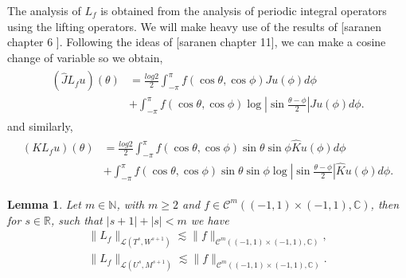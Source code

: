 \documentclass{article}
\newtheorem{lemma}[theorem]{Lemma}
\newcommand{\todo}[1]{{\color{red}[#1]}}
\newcommand{\IC}{{\mathbb C}}
\newcommand{\IN}{{\mathbb N}}
\newcommand{\IR}{{\mathbb R}}
\newcommand{\cmspace}[3]{\mathcal{C}^{#1} \left( #2, #3 \right)}
\newcommand{\iinterv}{(-1,1)\times(-1,1)}
\begin{document}
The analysis of $L_f$ is obtained from the analysis of periodic integral operators using the lifting operators. We will make heavy use of the results of \todo{saranen chapter 6  }. Following the ideas of \todo{saranen chapter 11}, we can make a cosine change of variable so we obtain,
\begin{align}
\label{eq:Lsplit}
\begin{split}
(\widehat{J}L_fu)(\theta) &= \frac{log{2}}{2} \int_{-\pi}^{\pi} f(\cos \theta , \cos \phi) Ju(\phi) d\phi \\&+ \int_{-\pi}^{\pi} f(\cos \theta, \cos \phi) \log \left\vert \sin \frac{\theta-\phi}{2} \right\vert Ju(\phi) d\phi.
\end{split}
\end{align}
and similarly, 
\begin{align}
\label{eq:Lsplitodd}
\begin{split}
(KL_fu)(\theta) &= \frac{log{2}}{2} \int_{-\pi}^{\pi} f(\cos \theta , \cos \phi)\sin \theta \sin \phi \widehat{K}u(\phi) d\phi \\&+ \int_{-\pi}^{\pi} f(\cos \theta, \cos \phi)\sin \theta \sin \phi \log \left\vert \sin \frac{\theta-\phi}{2} \right\vert \widehat{K}u(\phi) d\phi.
\end{split}
\end{align}
\begin{lemma}
\label{lemma:Lfoperator}
Let $m \in \IN$, with $m\geq 2$ and $f \in \cmspace{m}{\iinterv}{\IC}$, then  for $s \in \IR$, such that $|s+1| +|s| <m$ we have
\begin{align*}
\|L_f\|_{\mathcal{L}(T^s,W^{s+1})} \lesssim \|f\|_{\cmspace{m}{\iinterv}{\IC}},\\
\|L_f\|_{\mathcal{L}(U^s,M^{s+1})} \lesssim \|f\|_{\cmspace{m}{\iinterv}{\IC}}.
\end{align*}


\end{lemma}
\end{document}
